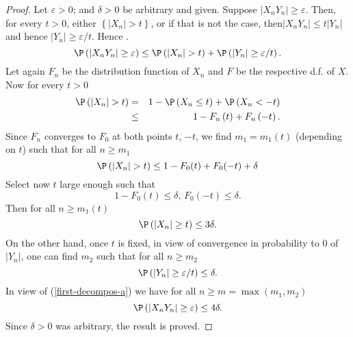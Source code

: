 \begin{proof}
Let $\varepsilon >0$; and $\delta >0$ be arbitrary and given. Suppose $%
\left\vert X_{n}Y_{n}\right\vert \geq \varepsilon $. Then, for every $t>0$,
either $\left\{ \left\vert X_{n}\right\vert >t\right\} $, or if that is not
the case, then$\left\vert X_{n}Y_{n}\right\vert \leq t\left\vert
Y_{n}\right\vert $ and hence $\left\vert Y_{n}\right\vert \geq \varepsilon
/t $. Hence . 
\begin{equation}
\P \left( \left\vert X_{n}Y_{n}\right\vert \geq \varepsilon \right) \leq
\P \left( \left\vert X_{n}\right\vert >t\right) +\P \left( \left\vert
Y_{n}\right\vert \geq \varepsilon /t\right) .  \label{first-decompos-a}
\end{equation}%
Let again $F_{n}$ be the distribution function of $X_{n}$ and $F$ be the
respective d.f. of $X$. Now for every $t>0$ 
\begin{eqnarray*}
\P \left( \left\vert X_{n}\right\vert >t\right) &=&1-\P \left( X_{n}\leq
t\right) +\P \left( X_{n}<-t\right) \\
&\leq &1-F_{n}\left( t\right) +F_{n}\left( -t\right) .
\end{eqnarray*}%
Since $F_{n}$ converges to $F_{0}$ at both points $t$, $-t$, we find $%
m_{1}=m_{1}(t)$ (depending on $t$) such that for all $n\geq m_{1}$ 
\begin{equation*}
\P \left( \left\vert X_{n}\right\vert >t\right) \leq
1-F_{0}(t)+F_{0}(-t)+\delta
\end{equation*}%
Select now $t$ large enough such that 
\begin{equation*}
1-F_{0}(t)\leq \delta \text{, }F_{0}(-t)\leq \delta .
\end{equation*}%
Then for all $n\geq m_{1}(t)$ 
\begin{equation*}
\P \left( \left\vert X_{n}\right\vert \geq t\right) \leq 3\delta .
\end{equation*}%
On the other hand, once $t$ is fixed, in view of convergence in probability
to $0$ of $\left\vert Y_{n}\right\vert $, one can find $m_{2}$ such that for
all $n\geq m_{2}$ 
\begin{equation*}
\P \left( \left\vert Y_{n}\right\vert \geq \varepsilon /t\right) \leq
\delta .
\end{equation*}%
In view of (\ref{first-decompos-a}) we have for all $n\geq m=\max
(m_{1},m_{2})$%
\begin{equation*}
\P \left( \left\vert X_{n}Y_{n}\right\vert \geq \varepsilon \right) \leq
4\delta .
\end{equation*}%
Since $\delta >0$ was arbitrary, the result is proved.
\end{proof}

